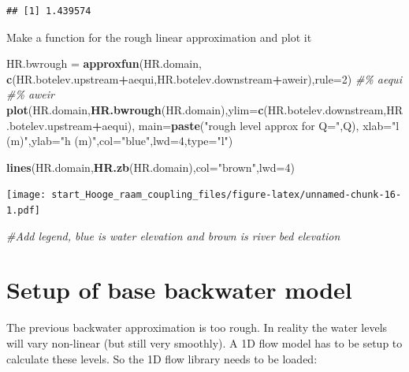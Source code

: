 \documentclass[
]{article}
\newenvironment{Shaded}{\begin{snugshade}}{\end{snugshade}}
\newcommand{\AttributeTok}[1]{\textcolor[rgb]{0.13,0.29,0.53}{#1}}
\newcommand{\CommentTok}[1]{\textcolor[rgb]{0.56,0.35,0.01}{\textit{#1}}}
\newcommand{\DecValTok}[1]{\textcolor[rgb]{0.00,0.00,0.81}{#1}}
\newcommand{\FunctionTok}[1]{\textcolor[rgb]{0.13,0.29,0.53}{\textbf{#1}}}
\newcommand{\NormalTok}[1]{#1}
\newcommand{\OtherTok}[1]{\textcolor[rgb]{0.56,0.35,0.01}{#1}}
\newcommand{\SpecialCharTok}[1]{\textcolor[rgb]{0.81,0.36,0.00}{\textbf{#1}}}
\newcommand{\StringTok}[1]{\textcolor[rgb]{0.31,0.60,0.02}{#1}}
\begin{document}
\begin{verbatim}
## [1] 1.439574
\end{verbatim}

Make a function for the rough linear approximation and plot it

\begin{Shaded}
\begin{Highlighting}[]
\NormalTok{HR.bwrough }\OtherTok{=} \FunctionTok{approxfun}\NormalTok{(HR.domain,}
                       \FunctionTok{c}\NormalTok{(HR.botelev.upstream}\SpecialCharTok{+}\NormalTok{aequi,HR.botelev.downstream}\SpecialCharTok{+}\NormalTok{aweir),}\AttributeTok{rule=}\DecValTok{2}\NormalTok{) }\CommentTok{\#\% aequi \#\% aweir}
\FunctionTok{plot}\NormalTok{(HR.domain,}\FunctionTok{HR.bwrough}\NormalTok{(HR.domain),}\AttributeTok{ylim=}\FunctionTok{c}\NormalTok{(HR.botelev.downstream,HR.botelev.upstream}\SpecialCharTok{+}\NormalTok{aequi),}
     \AttributeTok{main=}\FunctionTok{paste}\NormalTok{(}\StringTok{"rough level approx for Q="}\NormalTok{,Q),}
     \AttributeTok{xlab=}\StringTok{"l (m)"}\NormalTok{,}\AttributeTok{ylab=}\StringTok{"h (m)"}\NormalTok{,}\AttributeTok{col=}\StringTok{"blue"}\NormalTok{,}\AttributeTok{lwd=}\DecValTok{4}\NormalTok{,}\AttributeTok{type=}\StringTok{"l"}\NormalTok{)}

\FunctionTok{lines}\NormalTok{(HR.domain,}\FunctionTok{HR.zb}\NormalTok{(HR.domain),}\AttributeTok{col=}\StringTok{"brown"}\NormalTok{,}\AttributeTok{lwd=}\DecValTok{4}\NormalTok{)}
\end{Highlighting}
\end{Shaded}

\texttt{[image: start\_Hooge\_raam\_coupling\_files/figure-latex/unnamed-chunk-16-1.pdf]}

\begin{Shaded}
\begin{Highlighting}[]
\CommentTok{\#Add legend, blue is water elevation and brown is river bed elevation}
\end{Highlighting}
\end{Shaded}

\hypertarget{setup-of-base-backwater-model}{%
\section{Setup of base backwater
model}\label{setup-of-base-backwater-model}}

The previous backwater approximation is too rough. In reality the water
levels will vary non-linear (but still very smoothly). A 1D flow model
has to be setup to calculate these levels. So the 1D flow library needs
to be loaded:
\end{document}
